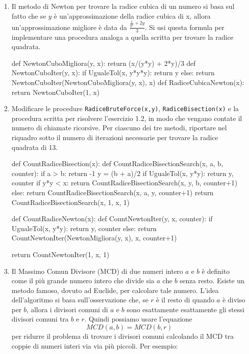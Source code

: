 \documentclass[11pt,a4]{article}
\begin{document}
\begin{enumerate}
\item Il metodo di Newton per trovare la radice cubica di un numero si basa sul fatto che se
$y$ è un'approssimazione della radice cubica di x, allora un'approssi\-mazione migliore è data
da $\frac{\frac{x}{y^2} + 2y}{3}$.
Si usi questa formula per implementare una procedura analoga a quella scritta per trovare
la radice quadrata.

\begin{python}
def NewtonCuboMigliora(y, x):
    return (x/(y*y) + 2*y)/3
def NewtonCuboIter(y, x):
    if UgualeTol(x, y*y*y):
        return y
    else:
        return NewtonCuboIter(NewtonCuboMigliora(y, x), x)    
def RadiceCubicaNewton(x):
    return NewtonCuboIter(1, x)
\end{python}

\item Modificare le procedure {\tt RadiceBruteForce(x,y)}, {\tt RadiceBisection(x)} e la procedura
scritta per risolvere l'esercizio 1.2, in modo che vengano contate il numero di chiamate ricorsive.
Per ciascuno dei tre metodi, riportare nel riquadro sotto il numero di iterazioni necessarie
per trovare la radice quadrata di 13.

\begin{python}    
def CountRadiceBisection(x):
	def CountRadiceBisectionSearch(x, a, b, counter):
		if a > b:
			return -1
		y = (b + a)/2
		if UgualeTol(x, y*y):
			return y, counter
		if y*y < x:
			return CountRadiceBisectionSearch(x, y, b, counter+1)
		else:
			return CountRadiceBisectionSearch(x, a, y, counter+1)
    return CountRadiceBisectionSearch(x, 1, x, 1)

def CountRadiceNewton(x):
	def CountNewtonIter(y, x, counter):
		if UgualeTol(x, y*y):
			return y, counter
		else:
			return CountNewtonIter(NewtonMigliora(y, x), x, counter+1)    

	return CountNewtonIter(1, x, 1)
\end{python}

\item Il Massimo Comun Divisore (MCD) di due numeri intero $a$ e $b$ è definito come 
il più grande numero intero che divide sia $a$ che $b$ senza resto. 
Esiste un metodo famoso, dovuto ad Euclide, per calcolare tale numero.
L'idea dell'algoritmo si basa sull'osservazione che, se $r$ è il resto di quando $a$ è diviso per $b$, 
allora i divisori comuni di $a$ e $b$ sono esattamente esattamente gli stessi divisori comuni tra $b$ e $r$. 
Quindi possiamo usare l'equazione $$MCD(a,b) = MCD(b,r)$$ per ridurre il problema di 
trovare i divisori comuni calcolando il MCD tra coppie di numeri interi via via più piccoli. Per esempio:


\end{enumerate}
\end{document}
